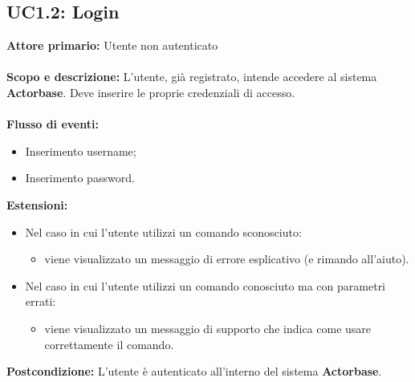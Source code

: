 \documentclass{scalatekids-article}
\begin{document}
\subsection{UC1.2: Login}
\textbf{Attore primario:} Utente non autenticato\\ \\
\textbf{Scopo e descrizione:} L’utente, già registrato, intende accedere al sistema \textbf{Actorbase}. Deve inserire le proprie credenziali di accesso. \\ \\
\textbf{Flusso di eventi:}
\begin{itemize}
\item Inserimento username;
\item Inserimento password.
\end{itemize}
\textbf{Estensioni:}
\begin{itemize}
\item Nel caso in cui l'utente utilizzi un comando sconosciuto:
  \begin{itemize}
  \item viene visualizzato un messaggio di errore esplicativo (e rimando all'aiuto).
  \end{itemize}
\item Nel caso in cui l'utente utilizzi un comando conosciuto ma con parametri errati:
  \begin{itemize}
  \item viene visualizzato un messaggio di supporto che indica come usare correttamente il comando.
  \end{itemize}
\end{itemize}
\textbf{Postcondizione:} L'utente è autenticato all'interno del sistema \textbf{Actorbase}.
\end{document}
